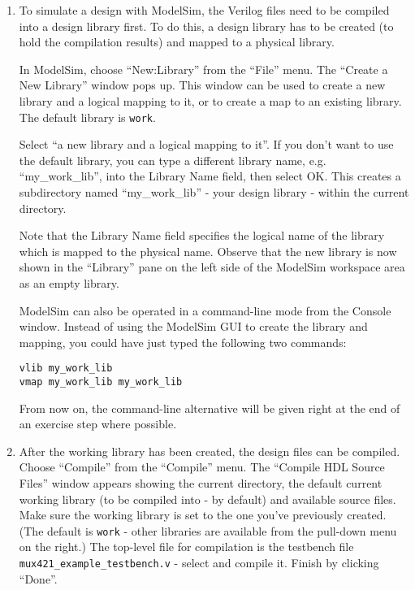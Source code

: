 \documentclass[a4paper,11pt]{article}
\begin{document}
\smallskip
{}
\smallskip
\begin{enumerate}
\item To simulate a design with ModelSim, the Verilog files need to be compiled
  into a design library first. To do this, a design library has to be created
  (to hold the compilation results) and mapped to a physical library.
  
  In ModelSim, choose ``New:Library'' from the ``File'' menu. The ``Create a
  New Library'' window pops up. This window can be used to create a new library
  and a logical mapping to it, or to create a map to an existing library. The
  default library is \verb#work#.
  
  Select ``a new library and a logical mapping to it''.  If you don't want to
  use the default library, you can type a different library name, e.g.
  ``my\_work\_lib'', into the Library Name field, then select OK.  This creates
  a subdirectory named ``my\_work\_lib'' - your design library - within the
  current directory.
  
  Note that the Library Name field specifies the logical name of the library
  which is mapped to the physical name.  Observe that the new library is now
  shown in the ``Library'' pane on the left side of the ModelSim workspace area
  as an empty library.
  
  ModelSim can also be operated in a command-line mode from the Console window.
  Instead of using the ModelSim GUI to create the library and mapping, you
  could have just typed the following two commands:

  \verb#vlib my_work_lib#\\
  \verb#vmap my_work_lib my_work_lib#
  
  From now on, the command-line alternative will be given right at the
  end of an exercise step where possible.
  
\item After the working library has been created, the design files can be
  compiled.  Choose ``Compile'' from the ``Compile'' menu. The ``Compile HDL
  Source Files'' window appears showing the current directory, the default
  current working library (to be compiled into - by default) and available
  source files.  Make sure the working library is set to the one you've
  previously created. (The default is \verb#work# - other libraries are
available from the pull-down menu on the right.) The top-level file for
  compilation is the testbench file \verb#mux421_example_testbench.v# - select
  and compile it. Finish by clicking ``Done''.


\end{enumerate}
\end{document}
